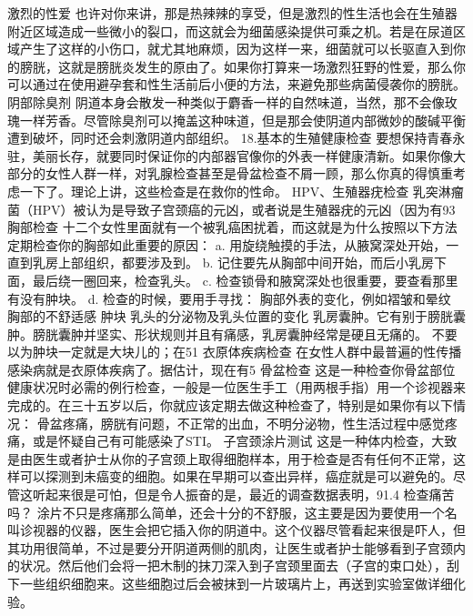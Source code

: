 \documentclass[12pt,UTF8,openany]{ctexbook}
\begin{document}
激烈的性爱
也许对你来讲，那是热辣辣的享受，但是激烈的性生活也会在生殖器附近区域造成一些微小的裂口，而这就会为细菌感染提供可乘之机。若是在尿道区域产生了这样的小伤口，就尤其地麻烦，因为这样一来，细菌就可以长驱直入到你的膀胱，这就是膀胱炎发生的原由了。如果你打算来一场激烈狂野的性爱，那么你可以通过在使用避孕套和性生活前后小便的方法，来避免那些病菌侵袭你的膀胱。
阴部除臭剂
阴道本身会散发一种类似于麝香一样的自然味道，当然，那不会像玫瑰一样芳香。尽管除臭剂可以掩盖这种味道，但是那会使阴道内部微妙的酸碱平衡遭到破坏，同时还会刺激阴道内部组织。
18.基本的生殖健康检查
要想保持青春永驻，美丽长存，就要同时保证你的内部器官像你的外表一样健康清新。如果你像大部分的女性人群一样，对乳腺检查甚至是骨盆检查不屑一顾，那么你真的得慎重考虑一下了。理论上讲，这些检查是在救你的性命。
HPV、生殖器疣检查
乳突淋瘤菌（HPV）被认为是导致子宫颈癌的元凶，或者说是生殖器疣的元凶（因为有93%
胸部检查
十二个女性里面就有一个被乳癌困扰着，而这就是为什么按照以下方法定期检查你的胸部如此重要的原因：
a. 用旋绕触摸的手法，从腋窝深处开始，一直到乳房上部组织，都要涉及到。
b. 记住要先从胸部中间开始，而后小乳房下面，最后绕一圈回来，检查乳头。
c. 检查锁骨和腋窝深处也很重要，要查看那里有没有肿块。
d. 检查的时候，要用手寻找：
胸部外表的变化，例如褶皱和晕纹
胸部的不舒适感
肿块
乳头的分泌物及乳头位置的变化
乳房囊肿。它有别于膀胱囊肿。膀胱囊肿并坚实、形状规则并且有痛感，乳房囊肿经常是硬且无痛的。
不要以为肿块一定就是大块儿的；在51%
衣原体疾病检查
在女性人群中最普遍的性传播感染病就是衣原体疾病了。据估计，现在有5%
骨盆检查
这是一种检查你骨盆部位健康状况时必需的例行检查，一般是一位医生手工（用两根手指）用一个诊视器来完成的。在三十五岁以后，你就应该定期去做这种检查了，特别是如果你有以下情况：
骨盆疼痛，膀胱有问题，不正常的出血，不明分泌物，性生活过程中感觉疼痛，或是怀疑自己有可能感染了STI。
子宫颈涂片测试
这是一种体内检查，大致是由医生或者护士从你的子宫颈上取得细胞样本，用于检查是否有任何不正常，这样可以探测到未癌变的细胞。如果在早期可以查出异样，癌症就是可以避免的。尽管这听起来很是可怕，但是令人振奋的是，最近的调查数据表明，91.4%
检查痛苦吗？
涂片不只是疼痛那么简单，还会十分的不舒服，这主要是因为要使用一个名叫诊视器的仪器，医生会把它插入你的阴道中。这个仪器尽管看起来很是吓人，但其功用很简单，不过是要分开阴道两侧的肌肉，让医生或者护士能够看到子宫颈内的状况。然后他们会将一把木制的抹刀深入到子宫颈里面去（子宫的束口处），刮下一些组织细胞来。这些细胞过后会被抹到一片玻璃片上，再送到实验室做详细化验。
\end{document}
